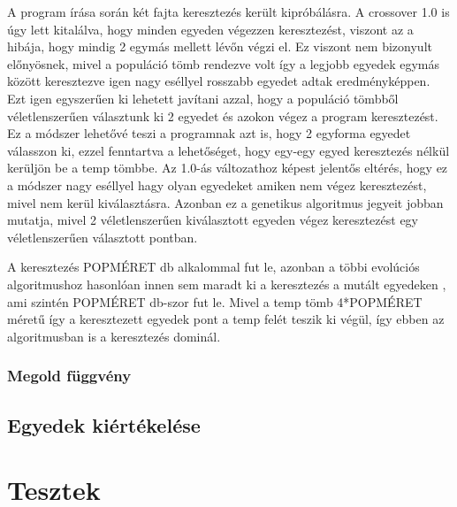 \documentclass[12ppt,a4paper,oneside]{report}
\begin{document}
                     
            {A program írása során két fajta keresztezés került kipróbálásra. A crossover 1.0 is úgy lett kitalálva, hogy minden egyeden végezzen keresztezést, viszont az a hibája, hogy mindig 2 egymás mellett lévőn végzi el. Ez viszont nem bizonyult előnyösnek, mivel a populáció tömb rendezve volt így a legjobb egyedek egymás között keresztezve igen nagy eséllyel rosszabb egyedet adtak eredményképpen. Ezt igen egyszerűen ki lehetett javítani azzal, hogy a populáció tömbből véletlenszerűen választunk ki 2 egyedet és azokon végez a program keresztezést. Ez a módszer lehetővé teszi a programnak azt is, hogy 2 egyforma egyedet válasszon ki, ezzel fenntartva a lehetőséget, hogy egy-egy egyed keresztezés nélkül kerüljön be a temp tömbbe. Az 1.0-ás változathoz képest jelentős eltérés, hogy ez a módszer nagy eséllyel hagy olyan egyedeket amiken nem végez keresztezést, mivel nem kerül kiválasztásra. Azonban ez a genetikus algoritmus jegyeit jobban mutatja, mivel 2 véletlenszerűen kiválasztott egyeden végez keresztezést egy véletlenszerűen választott pontban.}
            
            
            {A keresztezés POPMÉRET db alkalommal fut le, azonban a többi evolúciós algoritmushoz hasonlóan innen sem maradt ki a keresztezés a mutált egyedeken , ami szintén POPMÉRET db-szor fut le. Mivel a temp tömb 4*POPMÉRET méretű így a keresztezett egyedek pont a temp felét teszik ki végül, így ebben az algoritmusban is a keresztezés dominál.}

        \subsection{Megold függvény} %

    \section{Egyedek kiértékelése} %

\chapter{Tesztek} %
\end{document}
